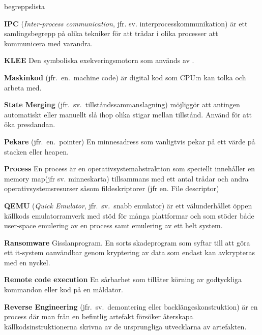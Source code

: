 \begin{labeling}{begreppslista}
    \item [\textbf{IPC}] (\emph{Inter-process communication}, jfr. sv.
          interprocesskommunikation) är ett samlingsbegrepp på olika
    tekniker för att trådar i olika processer att kommunicera med
    varandra.

    \item [\textbf{KLEE}] Den symboliska exekveringsmotorn som används
    av \stoe{}.

    \item [\textbf{Maskinkod}] (jfr.\ en.\ machine code) är digital
    kod som CPU:n kan tolka och arbeta med.

    \item [\textbf{State Merging}]
          (jfr.\ sv.\ tillståndssammanslagning) möjliggör att antingen
    automatiskt eller manuellt slå ihop olika stigar mellan
    tillstånd.  Använd för att öka presdandan.

    \item [\textbf{Pekare}] (jfr.\ en.\ pointer) En minnesadress som
    vanligtvis pekar på ett värde på stacken eller heapen.

    \item [\textbf{Process}] En process är en
    operativsystemabstraktion som speciellt innehåller en memory
    map(jfr sv. minneskarta) tillsammans med ett antal trådar och
    andra operativsystemsresurser såsom fildeskriptorer (jfr
    en. File descriptor)

    \item [\textbf{QEMU}] (\emph{Quick Emulator}, jfr.\ sv.\ snabb
          emulator) är ett välunderhållet öppen källkods emulatorramverk
    med stöd för många plattformar och som stöder både user-space
    emulering av en process samt emulering av ett helt system.

    \item [\textbf{Ransomware}] Gisslanprogram. En sorts skadeprogram
    som syftar till att göra ett it-system oanvändbar genom
    kryptering av data som endast kan avkrypteras med en nyckel.

    \item [\textbf{Remote code execution}] En sårbarhet som tillåter
    körning av godtyckliga kommandon eller kod på en måldator.

    \item [\textbf{Reverse Engineering}] (jfr.\ sv.\ demontering eller
          backlängeskonstruktion) är en process där man från en
    befintlig artefakt försöker återskapa källkodsinstruktionerna
    skrivna av de ursprungliga utvecklarna av artefakten.


\end{labeling}

